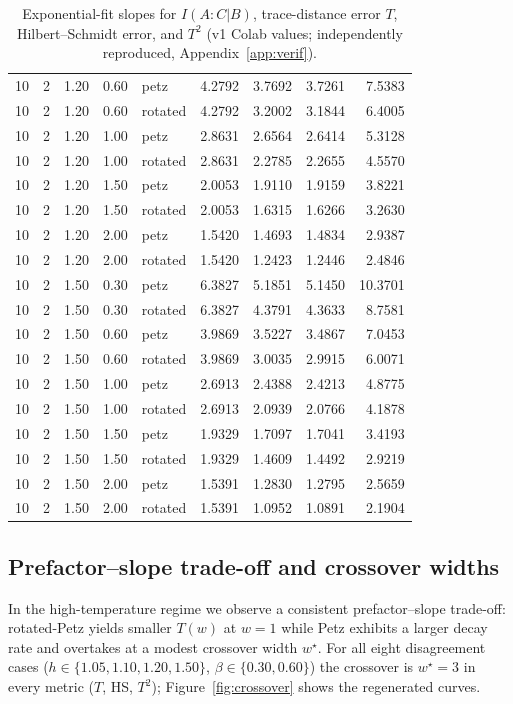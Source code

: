 \documentclass[11pt]{article}
\begin{document}
\begin{table}[htbp]
\begin{tabular}{cccclrrrr}
10 & 2 & 1.20 & 0.60 & petz & 4.2792 & 3.7692 & 3.7261 & 7.5383\\
10 & 2 & 1.20 & 0.60 & rotated & 4.2792 & 3.2002 & 3.1844 & 6.4005\\
10 & 2 & 1.20 & 1.00 & petz & 2.8631 & 2.6564 & 2.6414 & 5.3128\\
10 & 2 & 1.20 & 1.00 & rotated & 2.8631 & 2.2785 & 2.2655 & 4.5570\\
10 & 2 & 1.20 & 1.50 & petz & 2.0053 & 1.9110 & 1.9159 & 3.8221\\
10 & 2 & 1.20 & 1.50 & rotated & 2.0053 & 1.6315 & 1.6266 & 3.2630\\
10 & 2 & 1.20 & 2.00 & petz & 1.5420 & 1.4693 & 1.4834 & 2.9387\\
10 & 2 & 1.20 & 2.00 & rotated & 1.5420 & 1.2423 & 1.2446 & 2.4846\\
10 & 2 & 1.50 & 0.30 & petz & 6.3827 & 5.1851 & 5.1450 & 10.3701\\
10 & 2 & 1.50 & 0.30 & rotated & 6.3827 & 4.3791 & 4.3633 & 8.7581\\
10 & 2 & 1.50 & 0.60 & petz & 3.9869 & 3.5227 & 3.4867 & 7.0453\\
10 & 2 & 1.50 & 0.60 & rotated & 3.9869 & 3.0035 & 2.9915 & 6.0071\\
10 & 2 & 1.50 & 1.00 & petz & 2.6913 & 2.4388 & 2.4213 & 4.8775\\
10 & 2 & 1.50 & 1.00 & rotated & 2.6913 & 2.0939 & 2.0766 & 4.1878\\
10 & 2 & 1.50 & 1.50 & petz & 1.9329 & 1.7097 & 1.7041 & 3.4193\\
10 & 2 & 1.50 & 1.50 & rotated & 1.9329 & 1.4609 & 1.4492 & 2.9219\\
10 & 2 & 1.50 & 2.00 & petz & 1.5391 & 1.2830 & 1.2795 & 2.5659\\
10 & 2 & 1.50 & 2.00 & rotated & 1.5391 & 1.0952 & 1.0891 & 2.1904\\
\bottomrule
\end{tabular}
\caption{Exponential-fit slopes for $I(A:C|B)$, trace-distance error $T$,
Hilbert--Schmidt error, and $T^2$ (v1 Colab values; independently reproduced,
Appendix~\ref{app:verif}).}
\label{tab:slopes}
\end{table}

\subsection{Prefactor--slope trade-off and crossover widths}

In the high-temperature regime we observe a consistent prefactor--slope
trade-off: rotated-Petz yields smaller $T(w)$ at $w = 1$ while Petz exhibits a
larger decay rate and overtakes at a modest crossover width $w^\star$. For all
eight disagreement cases ($h \in \{1.05,1.10,1.20,1.50\}$,
$\beta \in \{0.30,0.60\}$) the crossover is $w^\star = 3$ in every metric
($T$, HS, $T^2$); Figure~\ref{fig:crossover} shows the regenerated curves.
\end{document}
